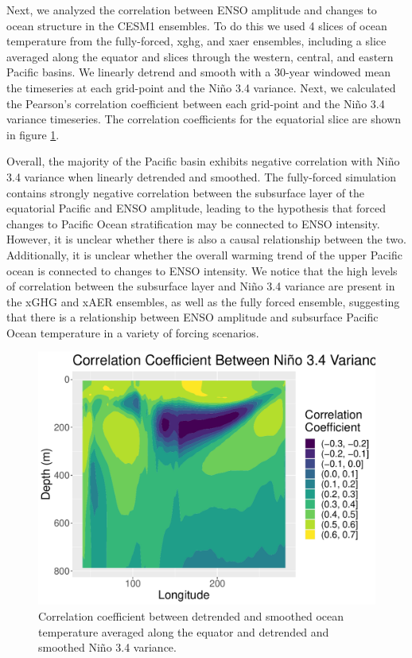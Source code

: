 \documentclass[11pt]{article}
\begin{document}
Next, we analyzed the correlation between ENSO amplitude and changes to ocean structure in the CESM1 ensembles. To do this we used 4 slices of ocean temperature from the fully-forced, xghg, and xaer ensembles, including a slice averaged along the equator and slices through the western, central, and eastern Pacific basins. We linearly detrend and smooth with a 30-year windowed mean the timeseries at each grid-point and the Niño 3.4 variance. Next, we calculated the Pearson's correlation coefficient between each grid-point and the Niño 3.4 variance timeseries. The correlation coefficients for the equatorial slice are shown in figure \ref{fig:tempdt}.

Overall, the majority of the Pacific basin exhibits negative correlation with Niño 3.4 variance when linearly detrended and smoothed. The fully-forced simulation contains strongly negative correlation between the subsurface layer of the equatorial Pacific and ENSO amplitude, leading to the hypothesis that forced changes to Pacific Ocean stratification may be connected to ENSO intensity. However, it is unclear whether there is also a causal relationship between the two. Additionally, it is unclear whether the overall warming trend of the upper Pacific ocean is connected to changes to ENSO intensity. We notice that the high levels of correlation between the subsurface layer and Niño 3.4 variance are present in the xGHG and xAER ensembles, as well as the fully forced ensemble, suggesting that there is a relationship between ENSO amplitude and subsurface Pacific Ocean temperature in a variety of forcing scenarios.

\begin{figure}
\centering
\includegraphics[width=.8\linewidth]{../../data/figures/tempdt.pdf}
\caption{\label{fig:tempdt}Correlation coefficient between detrended and smoothed ocean temperature averaged along the equator and detrended and smoothed Niño 3.4 variance.}
\end{figure}
\end{document}
